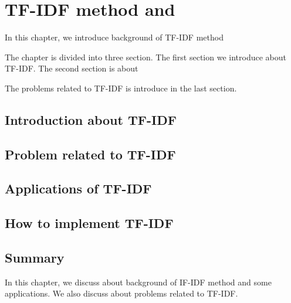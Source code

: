 \chapter{TF-IDF method and }\label{chap:bg}
In this chapter, we introduce background of TF-IDF method 

The chapter is divided into three section. The first section we introduce about TF-IDF. The second section is about 

The problems related to TF-IDF is introduce in the last section.

\clearpage
\section{Introduction about TF-IDF}\label{sec:bg_bg}


\section{Problem related to TF-IDF}


\section{Applications of TF-IDF}\label{sec:bg_appli}


\section{How to implement TF-IDF}\label{sec:bg_howto}



\section{Summary}\label{sec:bg_sm}

In this chapter, we discuss about background of IF-IDF method and some applications. We also discuss about problems related to TF-IDF.